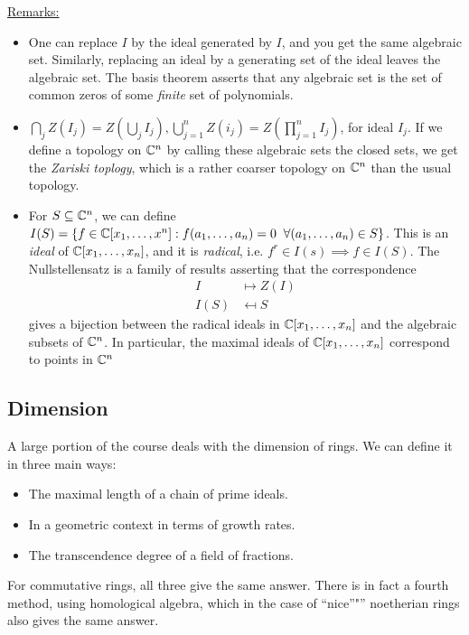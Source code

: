 \documentclass[10pt,a4paper]{article}
\begin{document}
\underline{Remarks:}
\begin{itemize}
\item One can replace $I$ by the ideal generated by $I$, and you get the same algebraic set. Similarly, replacing an ideal by a generating set of the ideal leaves the algebraic set. The basis theorem asserts that any algebraic set is the set of common zeros of some \emph{finite} set of polynomials.

\item $\bigcap_j Z(I_j) = Z(\bigcup_j I_j), \bigcup_{j=1}^n Z(i_j) = Z(\prod_{j=1}^n I_j)$, for ideal $I_j$. If we define a topology on $\mathbb{C}^n$ by calling these algebraic sets the closed sets, we get the \emph{Zariski toplogy}, which is a rather coarser topology on $\mathbb{C}^n$ than the usual topology.

\item For $S \subseteq \mathbb{C}^n$, we can define $I(S) = \{f \in \C[x_1, \ldots, x^n] : f(a_1, \ldots, a_n)=0\;\forall (a_1, \ldots, a_n) \in S\}$. This is an \emph{ideal} of $\mathbb{C}[x_1, \ldots, x_n]$, and it is \emph{radical}, i.e. $f^r \in I(s) \implies f \in I(S)$. The Nullstellensatz is a family of results asserting that the correspondence
\begin{align*}
I &\mapsto Z(I)\\
I(S) &\mapsfrom S
\end{align*}
gives a bijection between the radical ideals in $\mathbb{C}[x_1, \ldots, x_n]$ and the algebraic subsets of $\mathbb{C}^n$. In particular, the maximal ideals of $\mathbb{C}[x_1, \ldots, x_n]$ correspond to points in $\mathbb{C}^n$
\end{itemize}

\subsection*{Dimension}
A large portion of the course deals with the dimension of rings. We can define it in three main ways:
\begin{itemize}
\item The maximal length of a chain of prime ideals.
\item In a geometric context in terms of growth rates.
\item The transcendence degree of a field of fractions.
\end{itemize}
For commutative rings, all three give the same answer. There is in fact a fourth method, using homological algebra, which in the case of ``nice''"'' noetherian rings also gives the same answer.
\end{document}

